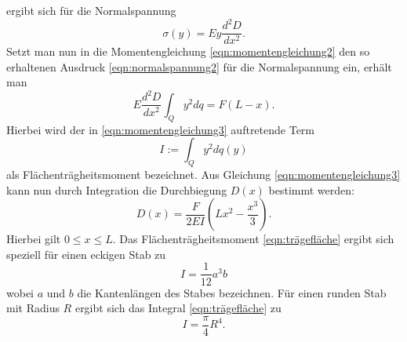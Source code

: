 ergibt sich für die Normalspannung
\begin{equation}
  \sigma (y) = E y \frac{d^2 D}{d x^2}.
  \label{eqn:normalspannung2}
\end{equation}
Setzt man nun in die Momentengleichung \eqref{eqn:momentengleichung2} den so erhaltenen Ausdruck \eqref{eqn:normalspannung2}
für die Normalspannung ein, erhält man
\begin{equation}
  E \frac{d^2 D}{d x^2} \int_Q y^2 dq = F(L - x).
  \label{eqn:momentengleichung3}
\end{equation}
Hierbei wird der in \eqref{eqn:momentengleichung3} auftretende Term
\begin{equation}
  I := \int_Q y^2 dq(y)
  \label{eqn:trägefläche}
\end{equation}
als Flächenträgheitsmoment bezeichnet.
Aus Gleichung \eqref{eqn:momentengleichung3} kann nun durch Integration die Durchbiegung $D(x)$ bestimmt
werden:
\begin{equation}
  D(x) = \frac{F}{2 E I} \left( L x^2 - \frac{x^3}{3} \right).
  \label{eqn:durchbiegungeinseitig}
\end{equation}
Hierbei gilt $0 \leq x \leq L$.
Das Flächenträgheitsmoment \eqref{eqn:trägefläche} ergibt sich speziell für einen eckigen Stab zu
\begin{equation}
  I = \frac{1}{12} a^3 b
  \label{eqn:I1}
\end{equation}
wobei $a$ und $b$ die Kantenlängen des Stabes bezeichnen. Für einen runden Stab mit Radius $R$ ergibt sich
das Integral \eqref{eqn:trägefläche} zu
\begin{equation}
    I = \frac{\pi}{4} R^4.
    \label{eqn:I2}
\end{equation}
